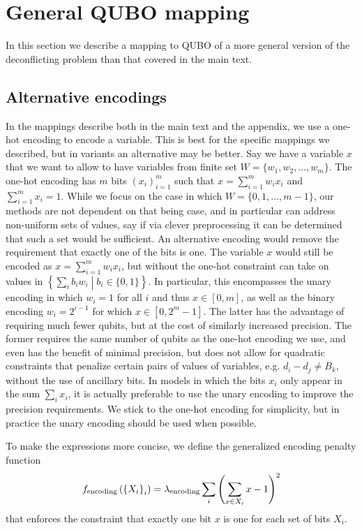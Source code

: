 \section{General QUBO mapping}
In this section we describe a mapping to QUBO of a more general version of the deconflicting problem than that covered in the main text.

\subsection{Alternative encodings}
In the mappings describe both in the main text and the appendix, we use a one-hot encoding to encode a variable.
This is best for the specific mappings we described, but in variants an alternative may be better.
Say we have a variable $x$ that we want to allow to have variables from finite set $W = \{w_1, w_2, \ldots, w_m\}$. 
The one-hot encoding has $m$ bits ${\left(x_{i}\right)}_{i=1}^m$ such that $x = \sum_{i=1}^m w_i x_i$ and $\sum_{i=1}^m x_i = 1$.
While we focus on the case in which $W = \{0, 1, \ldots, m -1\}$, our methods are not dependent on that being case, and in particular can address non-uniform sets of values, say if via clever preprocessing it can be determined that such a set would be sufficient.
An alternative encoding would remove the requirement that exactly one of the bits is one.
The variable $x$ would still be encoded as $x = \sum_{i=1}^m w_i x_i$, but without the one-hot constraint can take on values in $\left\{\sum_i b_i w_i \middle| b_i \in \{0, 1\}\right\}$.
In particular, this encompasses the unary encoding in which $w_i = 1$ for all $i$ and thus $x \in [0, m]$, as well as the binary encoding $w_i = 2^{i-1}$ for which $x \in [0, 2^m - 1]$.
The latter has the advantage of requiring much fewer qubits, but at the cost of similarly increased precision.
The former requires the same number of qubits as the one-hot encoding we use, and even has the benefit of minimal precision, but does not allow for quadratic constraints that penalize certain pairs of values of variables, e.g. $d_i - d_j \neq B_k$, without the use of ancillary bits.
In models in which the bits $x_{i}$ only appear in the sum $\sum_i x_i$, it is actually preferable to use the unary encoding to improve the precision requirements.
We stick to the one-hot encoding for simplicity, but in practice the unary encoding should be used when possible.

To make the expressions more concise, we define the generalized encoding penalty function
\begin{equation}
f_{\mathrm{encoding}}
\left(
{\left\{X_i\right\}}_i
\right)
=
\lambda_{\mathrm{encoding}}
\sum_i 
{\left(
  \sum_{x \in X_i} x - 1
\right)}^2
\end{equation}
that enforces the constraint that exactly one bit $x$ is one for each set of bits $X_i$.


